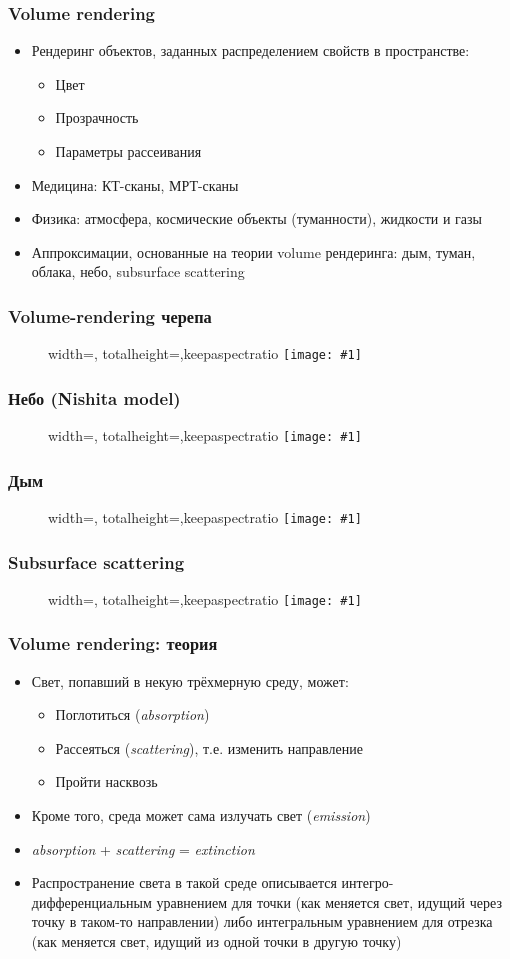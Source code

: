 \documentclass[10pt]{beamer}
\newcommand{\slideimage}[1]{
  \begin{figure}
    \begin{adjustbox}{width=\textwidth, totalheight=\textheight-2\baselineskip-2\baselineskip,keepaspectratio}
      \texttt{[image: \#1]}
    \end{adjustbox}
  \end{figure}
}
\begin{document}
\begin{frame}[fragile]
\frametitle{Volume rendering}
\begin{itemize}
\item Рендеринг объектов, заданных распределением свойств в пространстве:
\pause
\begin{itemize}
\item Цвет
\item Прозрачность
\item Параметры рассеивания
\end{itemize}
\pause
\item Медицина: КТ-сканы, МРТ-сканы
\item Физика: атмосфера, космические объекты (туманности), жидкости и газы
\item Аппроксимации, основанные на теории volume рендеринга: дым, туман, облака, небо, subsurface scattering
\end{itemize}
\end{frame}

\begin{frame}[fragile]
\frametitle{Volume-rendering черепа}
\slideimage{volume-skull.png}
\end{frame}

\begin{frame}[fragile]
\frametitle{Небо (Nishita model)}
\slideimage{sky.jpg}
\end{frame}

\begin{frame}[fragile]
\frametitle{Дым}
\slideimage{smoke.png}
\end{frame}

\begin{frame}[fragile]
\frametitle{Subsurface scattering}
\slideimage{subsurface.jpeg}
\end{frame}

\begin{frame}[fragile]
\frametitle{Volume rendering: теория}
\begin{itemize}
\item Свет, попавший в некую трёхмерную среду, может:
\pause
\begin{itemize}
\item Поглотиться (\textit{absorption})
\pause
\item Рассеяться (\textit{scattering}), т.е. изменить направление
\pause
\item Пройти насквозь
\end{itemize}
\pause
\item Кроме того, среда может сама излучать свет (\textit{emission})
\pause
\item \textit{absorption} + \textit{scattering} = \textit{extinction}
\pause
\item Распространение света в такой среде описывается интегро-дифференциальным уравнением для точки (как меняется свет, идущий через точку в таком-то направлении) либо интегральным уравнением для отрезка (как меняется свет, идущий из одной точки в другую точку)
\end{itemize}
\end{frame}
\end{document}
